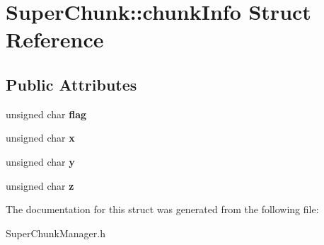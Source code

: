 \hypertarget{structSuperChunk_1_1chunkInfo}{\section{\-Super\-Chunk\-:\-:chunk\-Info \-Struct \-Reference}
\label{structSuperChunk_1_1chunkInfo}
}
\subsection*{\-Public \-Attributes}
\begin{DoxyCompactItemize}
\item 
\hypertarget{structSuperChunk_1_1chunkInfo_a90490f0fa34bbce9babf6b0ab2ffb491}{unsigned char {\bfseries flag}}\label{structSuperChunk_1_1chunkInfo_a90490f0fa34bbce9babf6b0ab2ffb491}

\item 
\hypertarget{structSuperChunk_1_1chunkInfo_a4e2cc31a2d503cc86a2c4b9a9565e037}{unsigned char {\bfseries x}}\label{structSuperChunk_1_1chunkInfo_a4e2cc31a2d503cc86a2c4b9a9565e037}

\item 
\hypertarget{structSuperChunk_1_1chunkInfo_a80e206ada4eeae53b76445c2ef442365}{unsigned char {\bfseries y}}\label{structSuperChunk_1_1chunkInfo_a80e206ada4eeae53b76445c2ef442365}

\item 
\hypertarget{structSuperChunk_1_1chunkInfo_aa2335fb7450abb91566d7f707e5e4800}{unsigned char {\bfseries z}}\label{structSuperChunk_1_1chunkInfo_aa2335fb7450abb91566d7f707e5e4800}

\end{DoxyCompactItemize}


\-The documentation for this struct was generated from the following file\-:\begin{DoxyCompactItemize}
\item 
\-Super\-Chunk\-Manager.\-h\end{DoxyCompactItemize}
